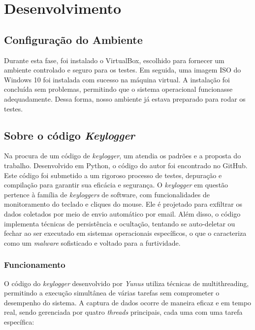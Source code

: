 \documentclass[12pt]{article}
\begin{document}
\section{Desenvolvimento}

\subsection{Configuração do Ambiente}

Durante esta fase, foi instalado o VirtualBox, escolhido para fornecer um ambiente controlado e seguro para os testes. Em seguida, uma imagem ISO do Windows 10 foi instalada com sucesso na máquina virtual. A instalação foi concluída sem problemas, permitindo que o sistema operacional funcionasse adequadamente. Dessa forma, nosso ambiente já estava preparado para rodar os testes.

\subsection{Sobre o código \textit{Keylogger}}

Na procura de um código de \textit{keylogger}, um atendia os padrões e a proposta do trabalho. Desenvolvido em Python, o código do autor \citep{Aydinnyunus} foi encontrado no GitHub. Este código foi submetido a um rigoroso processo de testes, depuração e compilação para garantir sua eficácia e segurança. O \textit{keylogger} em questão pertence à família de \textit{keyloggers} de software, com funcionalidades de monitoramento do teclado e cliques do mouse. Ele é projetado para exfiltrar os dados coletados por meio de envio automático por email. Além disso, o código implementa técnicas de persistência e ocultação, tentando se auto-deletar ou fechar ao ser executado em sistemas operacionais específicos, o que o caracteriza como um \textit{malware} sofisticado e voltado para a furtividade.

\subsubsection{Funcionamento}

O código do \textit{keylogger} desenvolvido por \textit{Yunus} utiliza técnicas de multithreading, permitindo a execução simultânea de várias tarefas sem comprometer o desempenho do sistema. A captura de dados ocorre de maneira eficaz e em tempo real, sendo gerenciada por quatro \textit{threads} principais, cada uma com uma tarefa específica:
\end{document}

